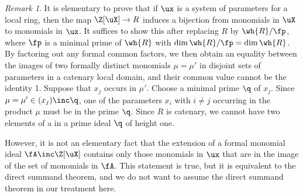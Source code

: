 \documentclass[12pt]{amsart}
\theoremstyle{plain}
\theoremstyle{remark}
\newtheorem{remark}[theorem]{Remark}
\newtheorem{discussion}[theorem]{Discussion}
\theoremstyle{definition}
\numberwithin{equation}{theorem}
\begin{document}

\begin{remark} It is elementary to prove that if $\ux$ is a 
system of parameters for a local ring, then the map $\Z[\uX] \to R$ 
induces a bijection from monomials in $\uX$ to monomials
in $\ux$.  It suffices to show this after replacing $R$ by
$\wh{R}/\fp$, where $\fp$ is a minimal prime of $\wh{R}$
with $\dim \wh{R}/\fp = \dim \wh{R}$. By factoring out any formal
common factors, we then obtain an equality 
between the  images of two formally distinct  monomials $\mu = \mu'$ in disjoint sets 
of parameters in a catenary local domain,  and their common value cannot 
be the identity 1. Suppose that $x_j$ occurs in $\mu'$. 
Choose a minimal prime $\q$ of $x_j$. Since $\mu = \mu' \in (x_j) \inc \q$,
one of the parameters $x_i$ with $i \neq j$ occurring in the product $\mu$ 
must be in the prime $\q$.  Since $R$ is catenary, we cannot have two elements of a \sop
in a prime ideal $\q$ of height one. \smallskip

However, it is not an elementary fact that the extension of 
a formal monomial ideal $\fA \inc \Z[\uX]$ contains only those 
monomials in $\ux$ that are in the image of the set of monomials in $\fA$.  
This statement is true, but it is equivalent to the direct summand 
theorem, and we do not want to assume the direct summand
theorem in our treatment here.
\end{remark}
\end{document}
